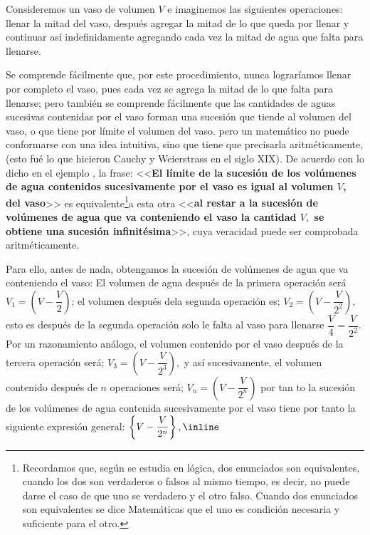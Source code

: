 \begin{ejemplo}

Consideremos un vaso de volumen $V$ e imaginemos las siguientes operaciones:
llenar la mitad del vaso, después agregar la mitad de lo que queda
por llenar y continuar así indefinidamente agregando cada vez la mitad
de agua que falta para llenarse. 

\end{ejemplo}

\sol Se comprende fácilmente que, por este procedimiento, nunca lograríamos
llenar por completo el vaso, pues cada vez se agrega la mitad de lo
que falta para llenarse; pero también se comprende fácilmente que
las cantidades de aguas sucesivas contenidas por el vaso forman una
sucesión que tiende al volumen del vaso, o que tiene por límite el
volumen del vaso. pero un matemático no puede conformarse con una
idea intuitiva, sino que tiene que precisarla aritméticamente, (esto
fué lo que hicieron Cauchy y Weierstrass en el siglo XIX). De acuerdo
con lo dicho en el ejemplo , la frase: <<\textbf{El
límite de la sucesión de los volúmenes de agua contenidos sucesivamente
por el vaso es igual al volumen $V$, del vaso}>> es equivalente\footnote{Recordamos que, según se estudia en lógica, dos enunciados son equivalentes,
cuando los dos son verdaderos o falsos al mismo tiempo, es decir,
no puede darse el caso de que uno se verdadero y el otro falso. Cuando
dos enunciados son equivalentes se dice Matemáticas que el uno es
condición necesaria y suficiente para el otro.}a esta otra <<\textbf{al restar a la sucesión de volúmenes de agua
que va conteniendo el vaso la cantidad $V,$ se obtiene una sucesión
infinitésima}>>, cuya veracidad puede ser comprobada aritméticamente.

Para ello, antes de nada, obtengamos la sucesión de volúmenes de agua
que va conteniendo el vaso: El volumen de agua después de la primera
operación será $V_{1}=\left(V-\dfrac{V}{2}\right)$; el volumen después
dela segunda operación es; $V_{2}=\left(V-\dfrac{V}{2^{2}}\right),$
esto es después de la segunda operación solo le falta al vaso para
llenarse $\dfrac{V}{4}=\dfrac{V}{2^{2}}.$ Por un razonamiento análogo,
el volumen contenido por el vaso después de la tercera operación será;
$V_{3}=\left(V-\dfrac{V}{2^{3}}\right),$ y así sucesivamente, el
volumen contenido después de $n$ operaciones será; $V_{n}=\left(V-\dfrac{V}{2^{n}}\right)$
por tan to la sucesión de los volúmenes de agua contenida sucesivamente
por el vaso tiene por tanto la siguiente expresión general: $\left\{ V-\dfrac{V}{2^{n}}\right\} ,\inline\text{\label{eq:ec2.5}}$

